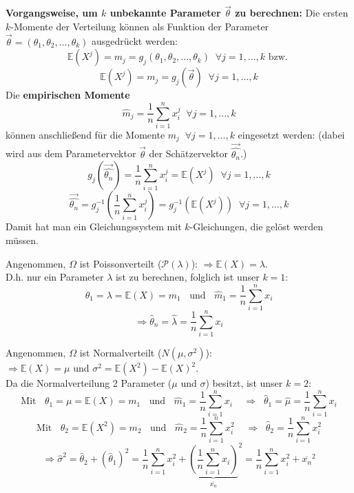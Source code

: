 \textbf{Vorgangsweise, um $k$ unbekannte Parameter $\vec\theta$ zu berechnen:}
    Die ersten $k$-Momente der Verteilung können als Funktion der Parameter $\vec\theta=(\theta_1,\theta_2,...,\theta_k)$ ausgedrückt werden:
        \[\mathbb{E}(X^j)=m_j=g_j(\theta_1, \theta_2, ..., \theta_k)\;\;\forall j=1,...,k\text{ bzw. }\]
        \[\mathbb{E}(X^j)=m_j=g_j(\vec\theta)\;\;\forall j=1,...,k\]
        Die \textbf{empirischen Momente}
        \[\hat m_j=\frac{1}{n}\sum_{i=1}^n x_i^j\;\;\forall j=1,...,k\]
        können anschließend für die Momente $m_j\;\;\forall j=1,...,k$ eingesetzt werden: (dabei wird aus dem Parametervektor $\vec\theta$ der Schätzervektor $\vec{\hat{\theta_n}}$.)
        \[g_j(\vec{\hat{\theta_n}})=\frac{1}{n}\sum_{i=1}^n x_i^j=\mathbb{E}(X^j)\;\;\forall j=1,...,k\]
        \[\vec{\hat{\theta_n}}=g_j^{-1}\left(\frac{1}{n}\sum_{i=1}^n x_i^j\right)=g_j^{-1}(\mathbb{E}(X^j))\;\;\forall j=1,...,k\]
        Damit hat man ein Gleichungssystem mit $k$-Gleichungen, die gelöst werden müssen.

\begin{bsp}
Angenommen, $\Omega$ ist Poissonverteilt ($\mathcal P(\lambda)$): $\Rightarrow\mathbb{E}(X)=\lambda$.\\
D.h. nur ein Parameter $\lambda$ ist zu berechnen, folglich ist unser $k=1$:
\[\theta_1=\lambda=\mathbb{E}(X)=m_1\;\;\text{ und }\;\;\hat m_1=\frac{1}{n}\sum_{i=1}^n x_i\]
\[\Rightarrow \hat\theta_n=\hat\lambda=\frac{1}{n}\sum_{i=1}^nx_i\]
\end{bsp}

\begin{bsp}
Angenommen, $\Omega$ ist Normalverteilt ($N(\mu, \sigma^2)$): \\
$\Rightarrow\mathbb{E}(X)=\mu$ und $\sigma^2=\mathbb{E}(X^2)-\mathbb{E}(X)^2$.\\
Da die Normalverteilung 2 Parameter ($\mu$ und $\sigma$) besitzt, ist unser $k=2$:
\[\text{Mit }\;\;\theta_1=\mu=\mathbb{E}(X)=m_1\;\;\text{ und }\;\;\hat m_1=\frac{1}{n}\sum_{i=1}^n x_i\;\;\;\;\Rightarrow\;\;\hat\theta_1=\hat\mu=\frac{1}{n}\sum_{i=1}^nx_i\]
\[\text{Mit }\;\;\theta_2=\mathbb{E}(X^2)=m_2\;\;\text{ und }\;\;\hat m_2=\frac{1}{n}\sum_{i=1}^n x_i^2\;\;\;\;\Rightarrow\;\;\hat\theta_2=\frac{1}{n}\sum_{i=1}^nx_i^2\]
\[\Rightarrow \hat\sigma^2=\hat\theta_2+(\hat\theta_1)^2=\frac{1}{n}\sum_{i=1}^nx_i^2+{\underbrace{\left(\frac{1}{n}\sum_{i=1}^nx_i\right)}_{\overline{x_n}}}^2=\frac{1}{n}\sum_{i=1}^nx_i^2+\overline{x_n}^2\]
\end{bsp}


